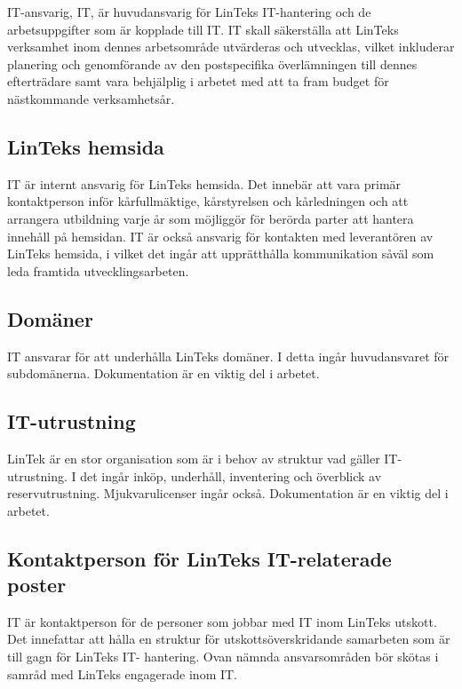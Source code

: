 IT-ansvarig, IT, är huvudansvarig för LinTeks IT-hantering och de
arbetsuppgifter som är kopplade till IT. IT skall säkerställa att
LinTeks verksamhet inom dennes arbetsområde utvärderas och utvecklas,
vilket inkluderar planering och genomförande av den postspecifika
överlämningen till dennes efterträdare samt vara behjälplig i arbetet
med att ta fram budget för nästkommande verksamhetsår.

\hypertarget{linteks-hemsida}{%
\subsection{LinTeks hemsida}\label{linteks-hemsida}}

IT är internt ansvarig för LinTeks hemsida. Det innebär att vara primär
kontaktperson inför kårfullmäktige, kårstyrelsen och kårledningen och
att arrangera utbildning varje år som möjliggör för berörda parter att
hantera innehåll på hemsidan. IT är också ansvarig för kontakten med
leverantören av LinTeks hemsida, i vilket det ingår att upprätthålla
kommunikation såväl som leda framtida utvecklingsarbeten.

\hypertarget{domuxe4ner}{%
\subsection{Domäner}\label{domuxe4ner}}

IT ansvarar för att underhålla LinTeks domäner. I detta ingår
huvudansvaret för subdomänerna. Dokumentation är en viktig del i
arbetet.

\hypertarget{it-utrustning}{%
\subsection{IT-utrustning}\label{it-utrustning}}

LinTek är en stor organisation som är i behov av struktur vad gäller
IT-utrustning. I det ingår inköp, underhåll, inventering och överblick
av reservutrustning. Mjukvarulicenser ingår också. Dokumentation är en
viktig del i arbetet.

\hypertarget{kontaktperson-fuxf6r-linteks-it-relaterade-poster}{%
\subsection{Kontaktperson för LinTeks IT-relaterade
poster}\label{kontaktperson-fuxf6r-linteks-it-relaterade-poster}}

IT är kontaktperson för de personer som jobbar med IT inom LinTeks
utskott. Det innefattar att hålla en struktur för utskottsöverskridande
samarbeten som är till gagn för LinTeks IT- hantering. Ovan nämnda
ansvarsområden bör skötas i samråd med LinTeks engagerade inom IT.



